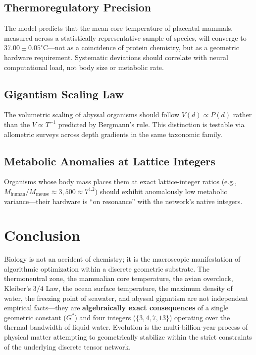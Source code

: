 \documentclass[11pt, letterpaper]{article}
\newcommand{\G}{G^*}
\theoremstyle{definition}
\theoremstyle{remark}
\begin{document}
\subsection{Thermoregulatory Precision}
The model predicts that the mean core temperature of placental mammals, measured across a statistically representative sample of species, will converge to $37.00 \pm 0.05^\circ$C---not as a coincidence of protein chemistry, but as a geometric hardware requirement. Systematic deviations should correlate with neural computational load, not body size or metabolic rate.

\subsection{Gigantism Scaling Law}
The volumetric scaling of abyssal organisms should follow $V(d) \propto P(d)$ rather than the $V \propto T^{-1}$ predicted by Bergmann's rule. This distinction is testable via allometric surveys across depth gradients in the same taxonomic family.

\subsection{Metabolic Anomalies at Lattice Integers}
Organisms whose body mass places them at exact lattice-integer ratios (e.g., $M_{\text{human}}/M_{\text{mouse}} \approx 3{,}500 \approx 7^{4.2}$) should exhibit anomalously low metabolic variance---their hardware is ``on resonance'' with the network's native integers.

\section{Conclusion}

Biology is not an accident of chemistry; it is the macroscopic manifestation of algorithmic optimization within a discrete geometric substrate. The thermoneutral zone, the mammalian core temperature, the avian overclock, Kleiber's $3/4$ Law, the ocean surface temperature, the maximum density of water, the freezing point of seawater, and abyssal gigantism are not independent empirical facts---they are \textbf{algebraically exact consequences} of a single geometric constant ($\G$) and four integers ($\{3, 4, 7, 13\}$) operating over the thermal bandwidth of liquid water. Evolution is the multi-billion-year process of physical matter attempting to geometrically stabilize within the strict constraints of the underlying discrete tensor network.
\end{document}
